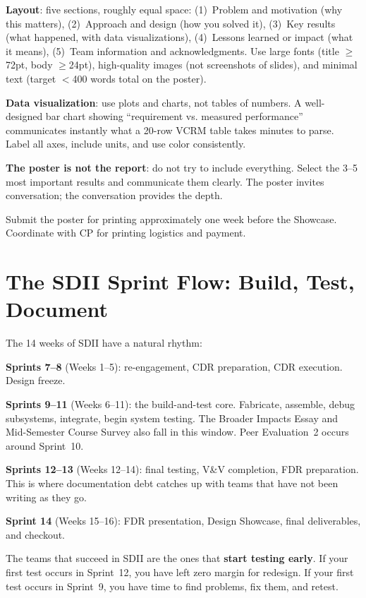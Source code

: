 \textbf{Layout}: five sections, roughly equal space: (1)~Problem and motivation (why this matters), (2)~Approach and design (how you solved it), (3)~Key results (what happened, with data visualizations), (4)~Lessons learned or impact (what it means), (5)~Team information and acknowledgments. Use large fonts (title $\geq$72pt, body $\geq$24pt), high-quality images (not screenshots of slides), and minimal text (target $<$400 words total on the poster).

\textbf{Data visualization}: use plots and charts, not tables of numbers. A well-designed bar chart showing ``requirement vs. measured performance'' communicates instantly what a 20-row VCRM table takes minutes to parse. Label all axes, include units, and use color consistently.

\textbf{The poster is not the report}: do not try to include everything. Select the 3--5 most important results and communicate them clearly. The poster invites conversation; the conversation provides the depth.

Submit the poster for printing approximately one week before the Showcase. Coordinate with CP for printing logistics and payment.

\section{The SDII Sprint Flow: Build, Test, Document}
The 14 weeks of SDII have a natural rhythm:

\textbf{Sprints 7--8} (Weeks 1--5): re-engagement, CDR preparation, CDR execution. Design freeze.

\textbf{Sprints 9--11} (Weeks 6--11): the build-and-test core. Fabricate, assemble, debug subsystems, integrate, begin system testing. The Broader Impacts Essay and Mid-Semester Course Survey also fall in this window. Peer Evaluation~2 occurs around Sprint~10.

\textbf{Sprints 12--13} (Weeks 12--14): final testing, V\&V completion, FDR preparation. This is where documentation debt catches up with teams that have not been writing as they go.

\textbf{Sprint 14} (Weeks 15--16): FDR presentation, Design Showcase, final deliverables, and checkout.

The teams that succeed in SDII are the ones that \textbf{start testing early}. If your first test occurs in Sprint~12, you have left zero margin for redesign. If your first test occurs in Sprint~9, you have time to find problems, fix them, and retest.

